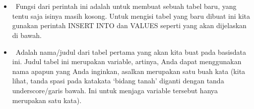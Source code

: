 \documentclass[letterpaper,10pt,english]{sphinxmanual}
\begin{document}
 

\begin{sphinxVerbatim}[commandchars=\\\{\}]
   
\end{sphinxVerbatim}

 
\begin{itemize}
\item {} 
  Fungsi dari perintah ini adalah untuk membuat sebuah tabel baru, yang tentu saja isinya masih kosong. Untuk mengisi tabel yang baru dibuat ini kita gunakan perintah INSERT INTO dan VALUES seperti yang akan dijelaskan di bawah.

\item {} 
  Adalah nama/judul dari tabel pertama yang akan kita buat pada basisdata ini. Judul tabel ini merupakan variable, artinya, Anda dapat menggunakan nama apapun yang Anda inginkan, asalkan merupakan satu buah kata (kita lihat, tanda spasi pada kata\sphinxhyphen{}kata ‘bidang tanah’ diganti dengan tanda underscore/garis bawah. Ini untuk menjaga variable tersebut hanya merupakan satu kata).

\end{itemize}

 

\begin{sphinxVerbatim}[commandchars=\\\{\}]
    
  
  
\end{sphinxVerbatim}
\end{document}
